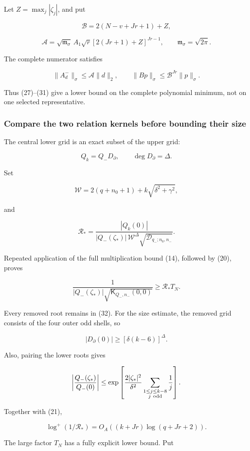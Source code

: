 \documentclass[11pt]{article}
\begin{document}
Let \(Z=\max_j|\zeta_j|\), and put

\[
\mathcal B=2(N-v+Jr+1)+Z,
\]

\[
\mathcal A
=
\sqrt{\mathfrak m_\sigma}\,A_1\sqrt r
[2(Jr+1)+Z]^{Jr-1},
\qquad \mathfrak m_\sigma=\sqrt{2\pi}.
\]

The complete numerator satisfies

\[
\|A_d^-\|_\sigma\le\mathcal A\|d\|_2,
\qquad
\|Bp\|_\sigma\le\mathcal B^{Jr}\|p\|_\sigma.
\]

Thus (27)--(31) give a lower bound on the complete polynomial minimum, not on one selected representative.

\subsubsection{Compare the two relation kernels before bounding their size}\label{compare-the-two-relation-kernels-before-bounding-their-size}

The central lower grid is an exact subset of the upper grid:

\[
Q_k=Q_-D_{\partial},\qquad \deg D_\partial=\Delta.
\]

Set

\[
\mathcal W=2(q+n_0+1)+k\sqrt{\delta^2+\gamma^2},
\]

and

\[
\boxed{
\mathcal R_*=
\frac{|Q_k(0)|}
{|Q_-(\zeta_*)|\,
 \mathcal W^\Delta
 \sqrt{\mathcal D_{q_-;n_0,n_-}}}.
}
\tag{32}
\]

Repeated application of the full multiplication bound (14), followed by (20), proves

\[
\frac1{|Q_-(\zeta_*)|
\sqrt{\mathsf K_{Q_-,n_-}(0,0)}}
\ge \mathcal R_*T_N.
\tag{33}
\]

Every removed root remains in (32). For the size estimate, the removed grid consists of the four outer odd shells, so

\[
|D_\partial(0)|\ge[\delta(k-6)]^\Delta.
\]

Also, pairing the lower roots gives

\[
\left|\frac{Q_-(\zeta_*)}{Q_-(0)}\right|
\le
\exp\left[
\frac{2|\zeta_*|^2}{\delta^2}
\sum_{\substack{1\le j\le k-8\\j\ {\rm odd}}}\frac1j
\right].
\]

Together with (21),

\[
\log^+(1/\mathcal R_*)
=
O_A((k+Jr)\log(q+Jr+2)).
\tag{34}
\]

The large factor \(T_N\) has a fully explicit lower bound. Put
\end{document}
